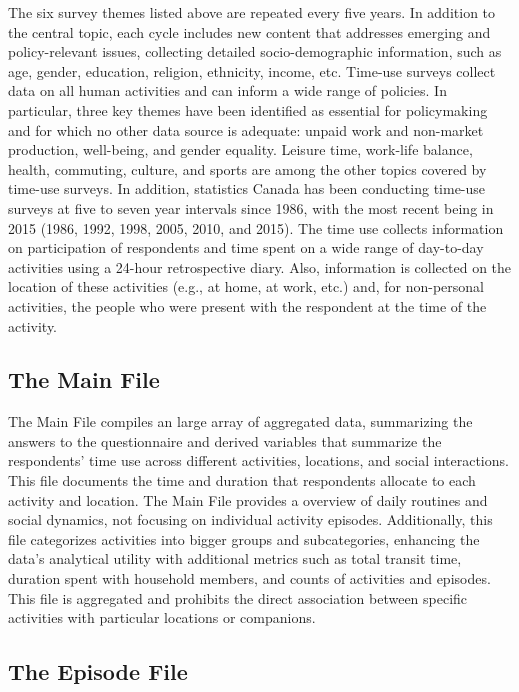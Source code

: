 \documentclass[Royal,times,sageh]{sagej}
\begin{document}
The six survey themes listed above are repeated every five years. In
addition to the central topic, each cycle includes new content that
addresses emerging and policy-relevant issues, collecting detailed
socio-demographic information, such as age, gender, education, religion,
ethnicity, income, etc. Time-use surveys collect data on all human
activities and can inform a wide range of policies. In particular, three
key themes have been identified as essential for policymaking and for
which no other data source is adequate: unpaid work and non-market
production, well-being, and gender equality. Leisure time, work-life
balance, health, commuting, culture, and sports are among the other
topics covered by time-use surveys. In addition, statistics Canada has
been conducting time-use surveys at five to seven year intervals since
1986, with the most recent being in 2015 (1986, 1992, 1998, 2005, 2010,
and 2015). The time use collects information on participation of
respondents and time spent on a wide range of day-to-day activities
using a 24-hour retrospective diary. Also, information is collected on
the location of these activities (e.g., at home, at work, etc.) and, for
non-personal activities, the people who were present with the respondent
at the time of the activity.

\hypertarget{the-main-file}{%
\subsection{The Main File}\label{the-main-file}}

The Main File compiles an large array of aggregated data, summarizing
the answers to the questionnaire and derived variables that summarize
the respondents' time use across different activities, locations, and
social interactions. This file documents the time and duration that
respondents allocate to each activity and location. The Main File
provides a overview of daily routines and social dynamics, not focusing
on individual activity episodes. Additionally, this file categorizes
activities into bigger groups and subcategories, enhancing the data's
analytical utility with additional metrics such as total transit time,
duration spent with household members, and counts of activities and
episodes. This file is aggregated and prohibits the direct association
between specific activities with particular locations or companions.

\hypertarget{the-episode-file}{%
\subsection{The Episode File}\label{the-episode-file}}
\end{document}
